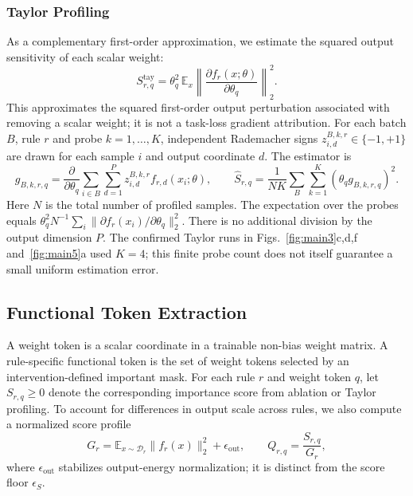 \documentclass{article}
\begin{document}
\subsubsection{Taylor Profiling}
As a complementary first-order approximation, we estimate the squared output sensitivity of each scalar weight:
\begin{equation}
S^{\mathrm{tay}}_{r,q}=\theta_q^2\,\mathbb{E}_x\left\|\frac{\partial f_r(x;\theta)}{\partial\theta_q}\right\|_2^2.
\label{eq:taylor_output}
\end{equation}
This approximates the squared first-order output perturbation associated with removing a scalar weight; it is not a task-loss gradient attribution. For each batch $B$, rule $r$ and probe $k=1,\ldots,K$, independent Rademacher signs $z_{i,d}^{B,k,r}\in\{-1,+1\}$ are drawn for each sample $i$ and output coordinate $d$. The estimator is
\begin{equation}
g_{B,k,r,q}=\frac{\partial}{\partial\theta_q}\sum_{i\in B}\sum_{d=1}^{P}z_{i,d}^{B,k,r}f_{r,d}(x_i;\theta),\qquad
\widehat S_{r,q}=\frac{1}{NK}\sum_B\sum_{k=1}^{K}(\theta_q g_{B,k,r,q})^2.
\label{eq:taylor_probe}
\end{equation}
Here $N$ is the total number of profiled samples. The expectation over the probes equals $\theta_q^2N^{-1}\sum_i\|\partial f_r(x_i)/\partial\theta_q\|_2^2$. There is no additional division by the output dimension $P$. The confirmed Taylor runs in Figs.~\ref{fig:main3}c,d,f and~\ref{fig:main5}a used $K=4$; this finite probe count does not itself guarantee a small uniform estimation error.

\subsection{Functional Token Extraction}

A weight token is a scalar coordinate in a trainable non-bias weight matrix. A rule-specific functional token is the set of weight tokens selected by an intervention-defined important mask. For each rule $r$ and weight token $q$, let $S_{r,q}\ge 0$ denote the corresponding importance score from ablation or Taylor profiling. To account for differences in output scale across rules, we also compute a normalized score profile
\begin{equation}
G_r=\mathbb{E}_{x\sim\mathcal{D}_r}\|f_r(x)\|_2^2+\epsilon_{\mathrm{out}},
\qquad
Q_{r,q}=\frac{S_{r,q}}{G_r},
\end{equation}
where $\epsilon_{\mathrm{out}}$ stabilizes output-energy normalization; it is distinct from the score floor $\epsilon_S$.
\end{document}
